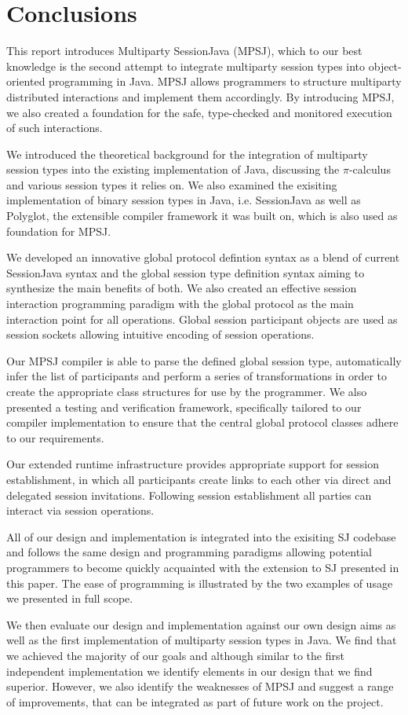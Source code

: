 \cleardoublepage
\chapter{Conclusions}
\label{ch:conclusions}



This report introduces Multiparty SessionJava (MPSJ), which to our best knowledge is the second attempt to integrate multiparty session types into object-oriented programming in Java. MPSJ allows programmers to structure multiparty distributed interactions and implement them accordingly. By introducing MPSJ, we also created a foundation for the safe, type-checked and monitored execution of such interactions.

We introduced the theoretical background for the integration of multiparty session types into the existing implementation of Java, discussing the $\pi$-calculus and various session types it relies on. We also examined the exisiting implementation of binary session types in Java, i.e. SessionJava as well as Polyglot, the extensible compiler framework it was built on, which is also used as foundation for MPSJ.

We developed an innovative global protocol defintion syntax as a blend of current SessionJava syntax and the global session type definition syntax aiming to synthesize the main benefits of both. We also created an effective session interaction programming paradigm with the global protocol as the main interaction point for all operations. Global session participant objects are used as session sockets allowing intuitive encoding of session operations.

Our MPSJ compiler is able to parse the defined global session type, automatically infer the list of participants and perform a series of transformations in order to create the appropriate class structures for use by the programmer. We also presented a testing and verification framework, specifically tailored to our compiler implementation to ensure that the central global protocol classes adhere to our requirements. 

Our extended runtime infrastructure provides appropriate support for session establishment, in which all participants create links to each other via direct and delegated session invitations. Following session establishment all parties can interact via session operations. 

All of our design and implementation is integrated into the exisiting SJ codebase and follows the same design and programming paradigms allowing potential programmers to become quickly acquainted with the extension to SJ presented in this paper. The ease of programming is illustrated by the two examples of usage we presented in full scope.

We then evaluate our design and implementation against our own design aims as well as the first implementation of multiparty session types in Java. We find that we achieved the majority of our goals and although similar to the first independent implementation we identify elements in our design that we find superior. However, we also identify the weaknesses of MPSJ and suggest a range of improvements, that can be integrated as part of future work on the project. 